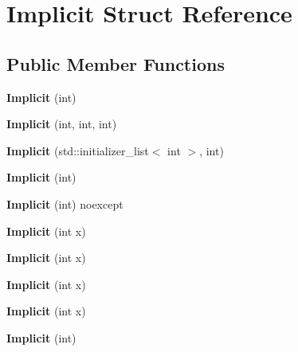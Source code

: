 \hypertarget{struct_implicit}{}\section{Implicit Struct Reference}
\label{struct_implicit}
\subsection*{Public Member Functions}
\begin{DoxyCompactItemize}
\item 
\mbox{\label{struct_implicit_a9f358484caa8afe579b408200403c73a}} 
{\bfseries Implicit} (int)
\item 
\mbox{\label{struct_implicit_a757c4a40df522c965188bd918bbd4ea1}} 
{\bfseries Implicit} (int, int, int)
\item 
\mbox{\label{struct_implicit_ad1ff048c312f5f40ad9b0bab8d31365a}} 
{\bfseries Implicit} (std\+::initializer\+\_\+list$<$ int $>$, int)
\item 
\mbox{\label{struct_implicit_a9f358484caa8afe579b408200403c73a}} 
{\bfseries Implicit} (int)
\item 
\mbox{\label{struct_implicit_a4a81aa7f0e082409677e483dc0189e67}} 
{\bfseries Implicit} (int) noexcept
\item 
\mbox{\label{struct_implicit_a9b3f747825a5d138bc4f5960a99c9ccc}} 
{\bfseries Implicit} (int x)
\item 
\mbox{\label{struct_implicit_a9b3f747825a5d138bc4f5960a99c9ccc}} 
{\bfseries Implicit} (int x)
\item 
\mbox{\label{struct_implicit_a9b3f747825a5d138bc4f5960a99c9ccc}} 
{\bfseries Implicit} (int x)
\item 
\mbox{\label{struct_implicit_a9b3f747825a5d138bc4f5960a99c9ccc}} 
{\bfseries Implicit} (int x)
\item 
\mbox{\label{struct_implicit_a9f358484caa8afe579b408200403c73a}} 
{\bfseries Implicit} (int)
\end{DoxyCompactItemize}
